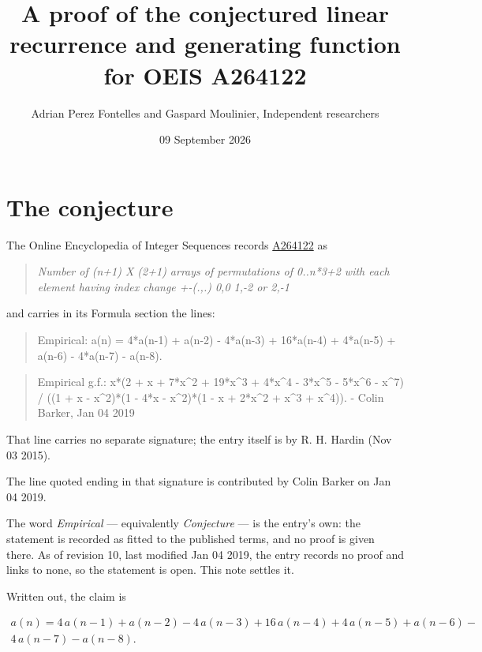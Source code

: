 \documentclass[11pt]{article}
\title{A proof of the conjectured linear recurrence and generating function for OEIS A264122}
\author{Adrian Perez Fontelles and Gaspard Moulinier, Independent researchers}
\date{09 September 2026}
\theoremstyle{definition}
\begin{document}
\maketitle
\section{The conjecture}

The Online Encyclopedia of Integer Sequences records \href{https://oeis.org/A264122}{A264122} as

\begin{quote}\itshape Number of (n+1) X (2+1) arrays of permutations of 0..n*3+2 with each element having index change +-(.,.) 0,0 1,-2 or 2,-1\end{quote}

and carries in its Formula section the lines:

\begin{quote}\ttfamily Empirical: a(n) = 4*a(n-1) + a(n-2) - 4*a(n-3) + 16*a(n-4) + 4*a(n-5) + a(n-6) - 4*a(n-7) - a(n-8).\end{quote}

\begin{quote}\ttfamily Empirical g.f.: x*(2 + x + 7*x\textasciicircum{}2 + 19*x\textasciicircum{}3 + 4*x\textasciicircum{}4 - 3*x\textasciicircum{}5 - 5*x\textasciicircum{}6 - x\textasciicircum{}7) / ((1 + x - x\textasciicircum{}2)*(1 - 4*x - x\textasciicircum{}2)*(1 - x + 2*x\textasciicircum{}2 + x\textasciicircum{}3 + x\textasciicircum{}4)). - Colin Barker, Jan 04 2019\end{quote}

That line carries no separate signature; the entry itself is by R. H. Hardin (Nov 03 2015).

The line quoted ending in that signature is contributed by Colin Barker on Jan 04 2019.

The word {\itshape Empirical} --- equivalently {\itshape Conjecture} --- is the entry's own: the statement is recorded as fitted to the published terms, and no proof is given there. As of revision 10, last modified Jan 04 2019, the entry records no proof and links to none, so the statement is open. This note settles it.

Written out, the claim is

\begin{multline*} a(n) = 4\,a(n-1) + a(n-2) - 4\,a(n-3) + 16\,a(n-4) + 4\,a(n-5) + a(n-6) - \\ 4\,a(n-7) - a(n-8). \end{multline*}
\end{document}
